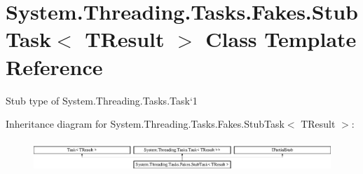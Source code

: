 \hypertarget{class_system_1_1_threading_1_1_tasks_1_1_fakes_1_1_stub_task_3_01_t_result_01_4}{\section{System.\-Threading.\-Tasks.\-Fakes.\-Stub\-Task$<$ T\-Result $>$ Class Template Reference}
\label{class_system_1_1_threading_1_1_tasks_1_1_fakes_1_1_stub_task_3_01_t_result_01_4}
}


Stub type of System.\-Threading.\-Tasks.\-Task`1 


Inheritance diagram for System.\-Threading.\-Tasks.\-Fakes.\-Stub\-Task$<$ T\-Result $>$\-:\begin{figure}[H]
\begin{center}
\leavevmode
\includegraphics[height=1.185185cm]{class_system_1_1_threading_1_1_tasks_1_1_fakes_1_1_stub_task_3_01_t_result_01_4}
\end{center}
\end{figure}
